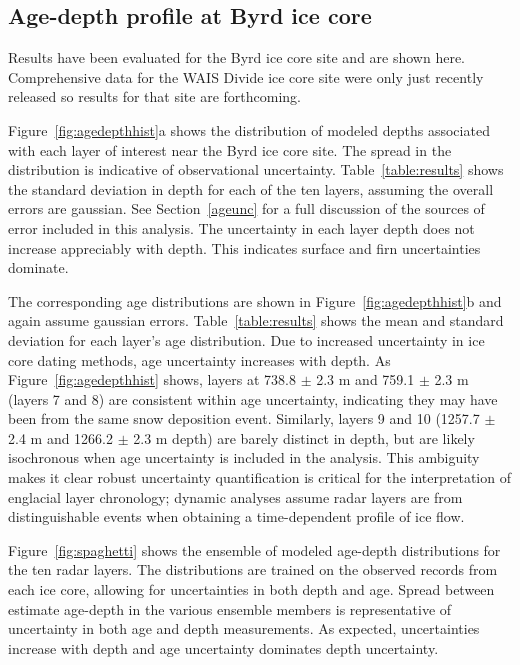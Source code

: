 \documentclass[12pt]{article}
\begin{document}
\subsection{Age-depth profile at Byrd ice core}
Results have been evaluated for the Byrd ice core site and are shown here. Comprehensive data for the WAIS Divide ice core site were only just recently released so results for that site are forthcoming. 

Figure~\ref{fig:agedepthhist}a shows the distribution of modeled depths associated with each layer of interest near the Byrd ice core site. The spread in the distribution is indicative of observational uncertainty. Table~\ref{table:results} shows the standard deviation in depth for each of the ten layers, assuming the overall errors are gaussian. See Section~\ref{ageunc} for a full discussion of the sources of error included in this analysis. The uncertainty in each layer depth does not increase appreciably with depth. This indicates surface and firn uncertainties dominate.

The corresponding age distributions are shown in Figure~\ref{fig:agedepthhist}b and again assume gaussian errors. Table~\ref{table:results} shows the mean and standard deviation for each layer's age distribution. Due to increased uncertainty in ice core dating methods, age uncertainty increases with depth. As Figure~\ref{fig:agedepthhist} shows, layers at 738.8 $\pm$ 2.3 m and 759.1 $\pm$ 2.3 m (layers 7 and 8) are consistent within age uncertainty, indicating they may have been from the same snow deposition event. Similarly, layers 9 and 10 (1257.7 $\pm$ 2.4 m and 1266.2 $\pm$ 2.3 m depth) are barely distinct in depth, but are likely isochronous when age uncertainty is included in the analysis.  This ambiguity makes it clear robust uncertainty quantification is critical for the interpretation of englacial layer chronology; dynamic analyses assume radar layers are from distinguishable events when obtaining a time-dependent profile of ice flow. 

Figure~\ref{fig:spaghetti} shows the ensemble of modeled age-depth distributions for the ten radar layers. The distributions are trained on the observed records from each ice core, allowing for uncertainties in both depth and age.  Spread between estimate age-depth in the various ensemble members is representative of uncertainty in both age and depth measurements. As expected,  uncertainties increase with depth and age uncertainty dominates depth uncertainty.
\end{document}
